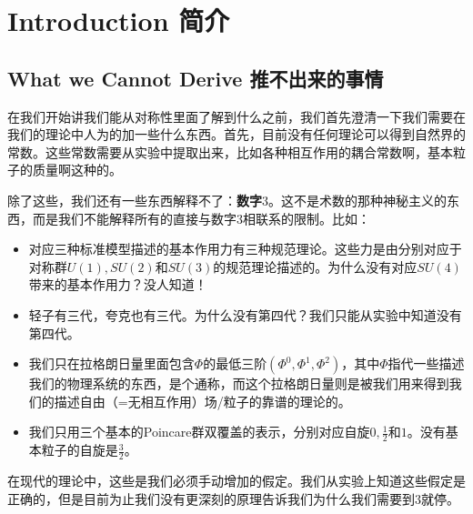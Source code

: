 


\chapter[简介]{Introduction 简介}\label{chap1}

\section[推不出来的事情]{What we Cannot Derive 推不出来的事情}\label{sec1.1}

在我们开始讲我们能从对称性里面了解到什么之前，我们首先澄清一下我们需要在我们的理论中人为的加一些什么东西。首先，目前没有任何理论可以得到自然界的常数。这些常数需要从实验中提取出来，比如各种相互作用的耦合常数啊，基本粒子的质量啊这种的。

除了这些，我们还有一些东西解释不了：{\bf 数字$3$}。这不是术数的那种神秘主义的东西，而是我们不能解释所有的直接与数字$3$相联系的限制。比如：

\begin{itemize}
\item 对应三种标准模型描述的基本作用力有三种规范理论。这些力是由分别对应于对称群$U(1), SU(2)$和$SU(3)$的规范理论描述的。为什么没有对应$SU(4)$带来的基本作用力？没人知道！
\item 轻子有三代，夸克也有三代。为什么没有第四代？我们只能从实验中知道没有第四代。
\item 我们只在拉格朗日量里面包含$\Phi$的最低三阶$(\Phi^0, \Phi^1, \Phi^2)$，其中$\Phi$指代一些描述我们的物理系统的东西，是个通称，而这个拉格朗日量则是被我们用来得到我们的描述自由（=无相互作用）场/粒子的靠谱的理论的。
\item 我们只用三个基本的Poincare群双覆盖的表示，分别对应自旋$0, \tfrac{1}{2}$和$1$。没有基本粒子的自旋是$\tfrac{3}{2}$。
\end{itemize}

在现代的理论中，这些是我们必须手动增加的假定。我们从实验上知道这些假定是正确的，但是目前为止我们没有更深刻的原理告诉我们为什么我们需要到$3$就停。

